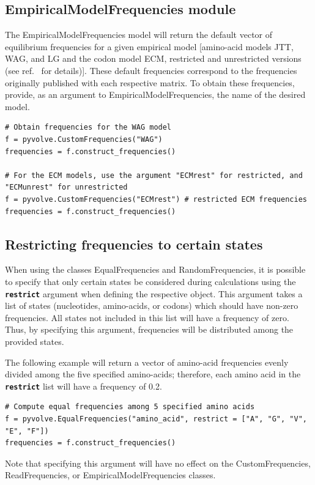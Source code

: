 \documentclass{article}
\newcommand{\code}[1]{\textbf{\texttt{\small{#1}}}}
\begin{document}
\subsection{EmpiricalModelFrequencies module}
The EmpiricalModelFrequencies model will return the default vector of equilibrium frequencies for a given empirical model [amino-acid models JTT, WAG, and LG and the codon model ECM, restricted and unrestricted versions (see ref.\ \citep{ECM} for details)]. These default frequencies correspond to the frequencies originally published with each respective matrix. To obtain these frequencies, provide, as an argument to EmpiricalModelFrequencies, the name of the desired model.
\begin{lstlisting}
# Obtain frequencies for the WAG model
f = pyvolve.CustomFrequencies("WAG")
frequencies = f.construct_frequencies()

# For the ECM models, use the argument "ECMrest" for restricted, and "ECMunrest" for unrestricted
f = pyvolve.CustomFrequencies("ECMrest") # restricted ECM frequencies
frequencies = f.construct_frequencies()
\end{lstlisting}




\subsection{Restricting frequencies to certain states}

When using the classes EqualFrequencies and RandomFrequencies, it is possible to specify that only certain states be considered during calculations using the \code{restrict} argument when defining the respective object. This argument takes a list of states (nucleotides, amino-acids, or codons) which should have non-zero frequencies. All states not included in this list will have a frequency of zero. Thus, by specifying this argument, frequencies will be distributed among the provided states. 

The following example will return a vector of amino-acid frequencies evenly divided among the five specified amino-acids; therefore, each amino acid in the \code{restrict} list will have a frequency of 0.2.
\begin{lstlisting}
# Compute equal frequencies among 5 specified amino acids
f = pyvolve.EqualFrequencies("amino_acid", restrict = ["A", "G", "V", "E", "F"])
frequencies = f.construct_frequencies()
\end{lstlisting}

Note that specifying this argument will have no effect on the CustomFrequencies, ReadFrequencies, or EmpiricalModelFrequencies classes.
\end{document}
